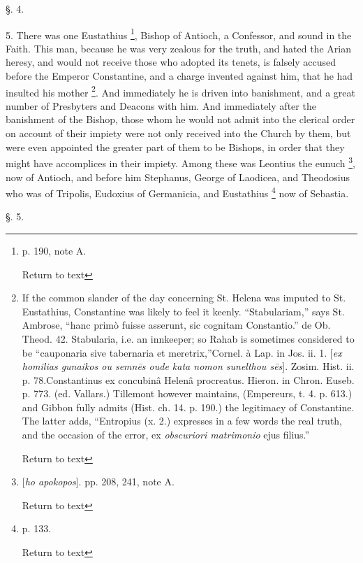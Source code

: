 §. 4.

5. There was one Eustathius \footnote{p. 190, note A.

Return to text}, Bishop of Antioch, a Confessor, and sound in the Faith. This
man, because he was very zealous for the truth, and hated the Arian
heresy, and would not receive those who adopted its tenets, is falsely
accused before the Emperor Constantine, and a charge invented against
him, that he had insulted his mother \footnote{If the common slander of the day concerning
St. Helena was imputed to St. Eustathius, Constantine was likely to
feel it keenly. ``Stabulariam,'' says St. Ambrose, ``hanc primò fuisse
asserunt, sic cognitam Constantio.'' de Ob. Theod. 42. Stabularia, i.e.
an innkeeper; so Rahab is sometimes considered to be ``cauponaria sive
tabernaria et meretrix,''Cornel. à Lap. in Jos. ii. 1. [\emph{ex homilias
gunaikos ou semn\={e}s oude kata nomon sunelthou s\={e}s}].
Zosim. Hist. ii. p. 78.Constantinus ex concubinâ Helenâ procreatus.
Hieron. in Chron. Euseb. p. 773. (ed. Vallars.) Tillemont however
maintains, (Empereurs, t. 4. p. 613.) and Gibbon fully admits (Hist.
ch. 14. p. 190.) the legitimacy of Constantine. The latter adds, ``Entropius
(x. 2.) expresses in a few words the real truth, and the occasion of
the error, ex \emph{obscuriori matrimonio} ejus filius.''

Return to text}. And immediately he is driven into banishment, and a great
number of Presbyters and Deacons with him. And immediately after the
banishment of the Bishop, those whom he would not admit into the
clerical order on account of their impiety were not only received into
the Church by them, but were even appointed the greater part of them
to be Bishops, in order that they might have accomplices in their
impiety. Among these was Leontius the eunuch \footnote{[\emph{ho apokopos}]. pp. 208, 241, note A.

Return to text}, now of Antioch, and before him Stephanus, George of Laodicea,
and Theodosius who was of Tripolis, Eudoxius of Germanicia, and
Eustathius \footnote{p. 133.

Return to text} now of
Sebastia.

§. 5.

